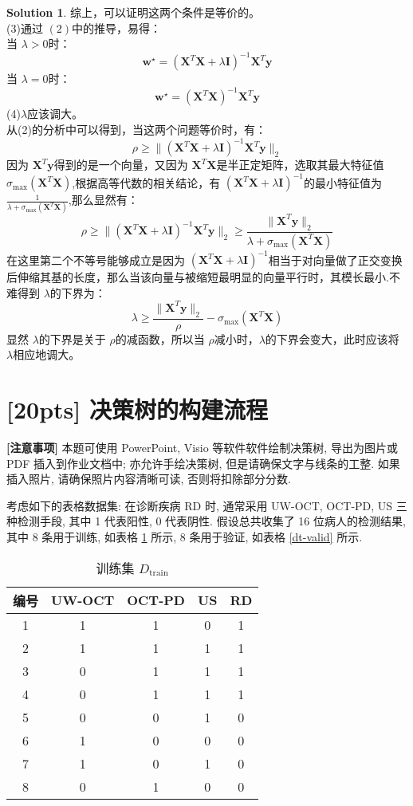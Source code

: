 \documentclass[a4paper]{article}
\numberwithin{equation}{section}
\theoremstyle{definition}
\newtheorem*{solution}{Solution}
\def \I {\mathbf{I}}
\def \X {\mathbf{X}}
\def \ws {\bm{w}^\star}
\def \y {\bm{y}}
\begin{document}
\begin{solution}
综上，可以证明这两个条件是等价的。\\
(3)通过 $(2)$中的推导，易得：\\
当 $\lambda > 0$时：
$$
\ws=(\X^T\X+\lambda\I)^{-1}\X^T\y$$
当 $\lambda = 0$时：
$$
\ws=(\X^T\X)^{-1}\X^T\y
$$
(4)$\lambda$应该调大。\\
从(2)的分析中可以得到，当这两个问题等价时，有：
$$
\rho \geq \|(\X^T\X + \lambda \I)^{-1}\X^T\y\|_{2}$$
因为 $\X^T\y$得到的是一个向量，又因为 $\X^T\X$是半正定矩阵，选取其最大特征值 $\sigma_{\text{max}}(\X^T\X)$,根据高等代数的相关结论，有 $(\X^T\X + \lambda \I)^{-1}$的最小特征值为 $\frac{1}{\lambda+\sigma_{\text{max}}(\X^T\X)}$,那么显然有：$$
\rho \geq \|(\X^T\X+\lambda \I)^{-1}\X^T\y\|_{2}\geq \frac{\|\X^T\y\|_{2}}{\lambda+\sigma_{\text{max}}(\X^T\X)} $$
在这里第二个不等号能够成立是因为 $(\X^T\X + \lambda \I)^{-1}$相当于对向量做了正交变换后伸缩其基的长度，那么当该向量与被缩短最明显的向量平行时，其模长最小.不难得到 $\lambda$的下界为：$$
\lambda \geq \frac{\|\X^T\y\|_{2}}{\rho}-\sigma_{\text{max}}(\X^T\X)
$$
显然 $\lambda$的下界是关于 $\rho$的减函数，所以当 $\rho$减小时，$\lambda$的下界会变大，此时应该将 $\lambda$相应地调大。
\end{solution}

\newpage

\section{[20pts] 决策树的构建流程}

\begin{tcolorbox}
	\textbf{[注意事项]} 本题可使用 PowerPoint\textsuperscript{\textregistered}, Visio\textsuperscript{\textregistered} 等软件软件绘制决策树, 导出为图片或 PDF 插入到作业文档中; 亦允许手绘决策树, 但是请确保文字与线条的工整. 如果插入照片, 请确保照片内容清晰可读, 否则将扣除部分分数.
\end{tcolorbox}

考虑如下的表格数据集: 在诊断疾病 RD 时, 通常采用 UW-OCT, OCT-PD, US 三种检测手段, 其中 1 代表阳性, 0 代表阴性. 假设总共收集了 16 位病人的检测结果, 其中 8 条用于训练, 如表格 \ref{dt-train} 所示, 8 条用于验证, 如表格 \ref{dt-valid} 所示.

\begin{table}[ht]
	\centering
	\setlength{\abovecaptionskip}{0pt}
	\setlength{\belowcaptionskip}{5pt}
	\caption{训练集 $D_{\mathrm{train}}$}
	\label{dt-train}
	\begin{tabular}{cccc|c}
		\hline
		编号 & UW-OCT & OCT-PD & US & RD \\
		\hline
		1  & 1      & 1      & 0  & 1  \\
		2  & 1      & 1      & 1  & 1  \\
		3  & 0      & 1      & 1  & 1  \\
		4  & 0      & 1      & 1  & 1  \\
		5  & 0      & 0      & 1  & 0  \\
		6  & 1      & 0      & 0  & 0  \\
		7  & 1      & 0      & 1  & 0  \\
		8  & 0      & 1      & 0  & 0  \\
		\hline
	\end{tabular}
\end{table}
\end{document}
